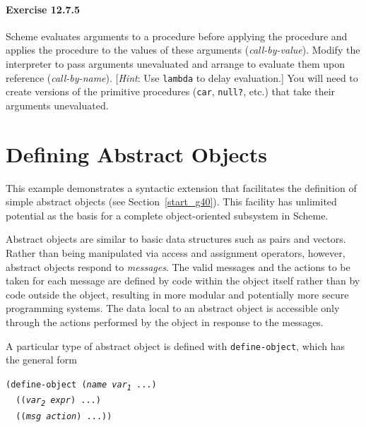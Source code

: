 \paragraph{Exercise \label{examples_g192}12.7.5}


\label{examples_s56}Scheme evaluates arguments to a procedure before applying the procedure
and applies the procedure to the values of these arguments
(\label{examples_s57}\textit{call-by-value}).
Modify the interpreter to pass arguments unevaluated and arrange to
evaluate them upon reference (\label{examples_s58}\textit{call-by-name}).
[\textit{Hint}: Use \texttt{lambda} to \label{examples_s59}delay evaluation.]
You will need to create versions of the primitive procedures (\texttt{car},
\texttt{null?}, etc.) that take their arguments unevaluated.


\section{\label{examples_g193}\label{examples_h8}Defining Abstract Objects\label{examples_SECTEXOBJECTS}}



This example demonstrates a syntactic extension that facilitates the
definition of simple \label{examples_s60}abstract objects (see Section \ref{start_g40}).
This facility has unlimited potential as the basis for a complete
\label{examples_s61}object-oriented subsystem in Scheme.


Abstract objects are similar to basic data structures such as pairs
and vectors.
Rather than being manipulated via access and assignment operators,
however, abstract objects respond to \label{examples_s62}\textit{messages}.
The valid messages and the actions to be taken for each message are
defined by code within the object itself rather than by code outside
the object, resulting in more modular and potentially more secure
programming systems.
The data local to an abstract object is accessible only through the
actions performed by the object in response to the messages.


A particular type of abstract object is defined with \label{examples_s63}\texttt{define-object},
which has the general form


\begin{alltt}
(define-object (\textit{name} \textit{var\textsubscript{1}} ...)
  ((\textit{var\textsubscript{2}} \textit{expr}) ...)
  ((\textit{msg} \textit{action}) ...))
\end{alltt}


